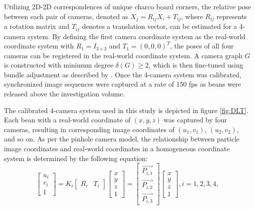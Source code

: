 \documentclass[draftthesis,fullpage]{uiucthesis}
\begin{document}
Utilizing 2D-2D correspondences of unique charco board corners, the relative pose between each pair of cameras, denoted as $X_j = R_{ij}X_i + T_{ij}$, where $R_{ij}$ represents a rotation matrix and $T_{ij}$ denotes a translation vector, can be estimated for a 4-camera system. By defining the first camera coordinate system as the real-world coordinate system with $R_1 = I_{3 \times 3}$ and $T_1 = (0,0,0)^T$, the poses of all four cameras can be registered in the real-world coordinate system. A camera graph $G$ is constructed with minimum degree $\delta (G) \geq 2$, which is then fine-tuned using bundle adjustment as described by \cite{engels2006bundle}. Once the 4-camera system was calibrated, synchronized image sequences were captured at a rate of 150 fps as beans were released above the investigation volume.

The calibrated 4-camera system used in this study is depicted in figure \ref{fig:DLT}. Each bean with a real-world coordinate of $(x,y,z)$ was captured by four cameras, resulting in corresponding image coordinates of $(u_1,v_1)$, $(u_2,v_2)$, and so on. As per the pinhole camera model, the relationship between particle image coordinates and real-world coordinates in a homogeneous coordinate system is determined by the following equation:
\begin{equation}
       \left[\begin{array}{c}
              u_i \\
              v _i\\
              1
              \end{array}\right]=K_i\left[\begin{array}{ll}
              R_i & T_i
              \end{array}\right]\left[\begin{array}{c}
              x \\
              y \\
              z \\
              1
              \end{array}\right] = \left[\begin{array}{c}
                     \overrightarrow{P_{i,1}}\\
                     \overrightarrow{P_{i,2}}\\
                     \overrightarrow{P_{i,3}}
              \end{array}\right] \left[\begin{array}{c}
                     x \\
                     y \\
                     z \\
                     1
                     \end{array}\right]      , i = 1,2,3,4,
\end{equation}
\end{document}
